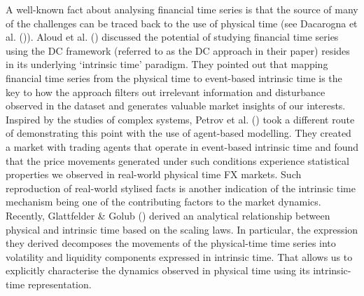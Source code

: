 A well-known fact about analysing financial time series is that the source of many of the challenges can be traced back to the use of physical time (see Dacarogna et al. (\citeyear{genccay2001introduction})). Aloud et al. (\citeyear{aloud2012directional}) discussed the potential of studying financial time series using the DC framework (referred to as the DC approach in their paper) resides in its underlying `intrinsic time' paradigm. They pointed out that mapping financial time series from the physical time to event-based intrinsic time is the key to how the approach filters out irrelevant information and disturbance observed in the dataset and generates valuable market insights of our interests. Inspired by the studies of complex systems, Petrov et al. (\citeyear{petrov2018agent}) took a different route of demonstrating this point with the use of agent-based modelling. They created a market with trading agents that operate in event-based intrinsic time and found that the price movements generated under such conditions experience statistical properties we observed in real-world physical time FX markets. Such reproduction of real-world stylised facts is another indication of the intrinsic time mechanism being one of the contributing factors to the market dynamics. Recently, Glattfelder \& Golub (\citeyear{glattfelder2022bridging}) derived an analytical relationship between physical and intrinsic time based on the scaling laws. In particular, the expression they derived decomposes the movements of the physical-time time series into volatility and liquidity components expressed in intrinsic time. That allows us to explicitly characterise the dynamics observed in physical time using its intrinsic-time representation.

